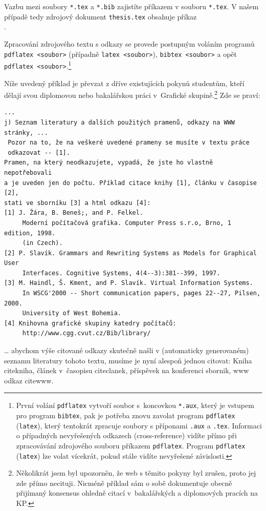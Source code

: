 \documentclass[11pt,twoside,a4paper]{book}
\begin{document}
Vazbu mezi soubory \verb|*.tex| a \verb|*.bib| zajistíte příkazem 
\verb|| v souboru \verb|*.tex|.  V našem případě tedy zdrojový 
dokument \verb|thesis.tex| obsahuje příkaz\\
\verb||.

Zpracování zdrojového textu s odkazy se provede postupným voláním programů\\
\verb|pdflatex <soubor>| (případně \verb|latex <soubor>|), \verb|bibtex <soubor>| 
a opět\\ \verb|pdflatex <soubor>|.\footnote{První volání \texttt{pdflatex} 
vytvoří soubor s~koncovkou \texttt{*.aux}, který je vstupem pro program 
\texttt{bibtex}, pak je potřeba znovu zavolat program \texttt{pdflatex} 
(\texttt{latex}), který tentokrát zpracuje soubory s příponami \texttt{.aux} a 
\texttt{.tex}. 
Informaci o případných nevyřešených odkazech (cross-reference) vidíte přímo při 
zpracovávání zdrojového souboru příkazem \texttt{pdflatex}. Program \texttt{pdflatex} 
(\texttt{latex}) lze volat vícekrát, pokud stále vidíte nevyřešené závislosti.}


Níže uvedený příklad je převzat z dříve existujících pokynů studentům, kteří 
dělají svou diplomovou nebo bakalářskou práci v~Grafické skupině.\footnote{Několikrát 
jsem byl upozorněn, že web s těmito pokyny byl zrušen, proto jej zde přímo necituji. 
Nicméně příklad sám o sobě dokumentuje obecně přijímaný konsensus ohledně citací 
v~bakalářských a diplomových pracích na KP.} Zde se praví:
\begin{small}
\begin{verbatim}
...
j) Seznam literatury a dalších použitých pramenů, odkazy na WWW stránky, ...
 Pozor na to, že na veškeré uvedené prameny se musíte v textu práce 
 odkazovat -- [1]. 
Pramen, na který neodkazujete, vypadá, že jste ho vlastně nepotřebovali 
a je uveden jen do počtu. Příklad citace knihy [1], článku v časopise [2], 
stati ve sborníku [3] a html odkazu [4]: 
[1] J. Žára, B. Beneš;, and P. Felkel. 
     Moderní počítačová grafika. Computer Press s.r.o, Brno, 1 edition, 1998. 
     (in Czech). 
[2] P. Slavík. Grammars and Rewriting Systems as Models for Graphical User 
     Interfaces. Cognitive Systems, 4(4--3):381--399, 1997. 
[3] M. Haindl, Š. Kment, and P. Slavík. Virtual Information Systems. 
     In WSCG'2000 -- Short communication papers, pages 22--27, Pilsen, 2000. 
     University of West Bohemia. 
[4] Knihovna grafické skupiny katedry počítačů: 
     http://www.cgg.cvut.cz/Bib/library/ 
\end{verbatim}
\end{small}
\ldots{} abychom výše citované odkazy skutečně našli v (automaticky generovaném) seznamu literatury tohoto textu, musíme je nyní alespoň jednou citovat: Kniha cite{kniha}, článek v~časopisu cite{clanek}, příspěvek na konferenci {sbornik}, www odkaz cite{www}.
\end{document}

